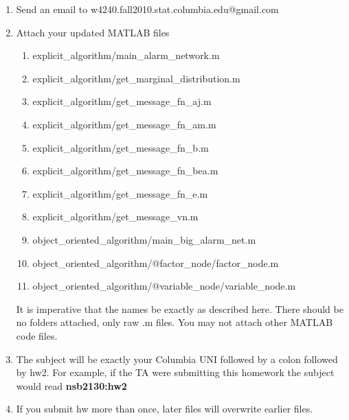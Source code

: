 \documentclass[12pt]{article}
\begin{document}
\begin{enumerate}
	\item Send an email to w4240.fall2010.stat.columbia.edu@gmail.com
	\item {Attach your updated MATLAB files 
		\begin{enumerate}
			\item explicit\_algorithm/main\_alarm\_network.m
			\item explicit\_algorithm/get\_marginal\_distribution.m
			\item explicit\_algorithm/get\_message\_fn\_aj.m 
			\item explicit\_algorithm/get\_message\_fn\_am.m 
			\item explicit\_algorithm/get\_message\_fn\_b.m 
			\item explicit\_algorithm/get\_message\_fn\_bea.m
			\item explicit\_algorithm/get\_message\_fn\_e.m
			\item explicit\_algorithm/get\_message\_vn.m
			\item object\_oriented\_algorithm/main\_big\_alarm\_net.m
			\item object\_oriented\_algorithm/@factor\_node/factor\_node.m
			\item object\_oriented\_algorithm/@variable\_node/variable\_node.m
		\end{enumerate} It is imperative that the names be exactly as described here. There should be no folders attached, only raw .m files.  You may not attach other MATLAB code files. }
	\item The subject will be exactly your Columbia UNI followed by a colon followed by hw2.  For example, if the TA were submitting this homework the subject would read {\bf nsb2130:hw2}
	\item If you submit hw more than once, later files will overwrite earlier files.
\end{enumerate}


\problemsdone
\end{document}
